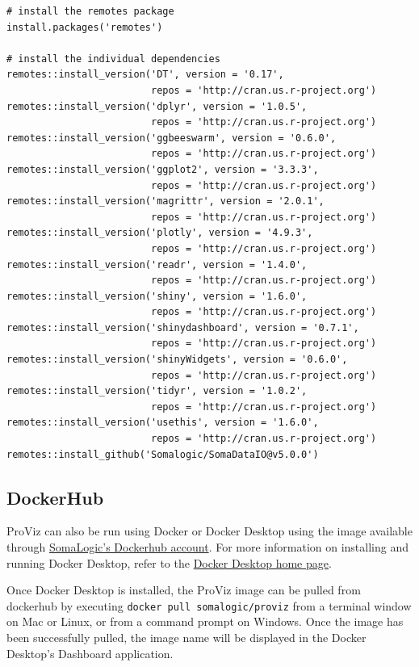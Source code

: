 \documentclass[
]{book}
\begin{document}
\begin{verbatim}
# install the remotes package 
install.packages('remotes')

# install the individual dependencies
remotes::install_version('DT', version = '0.17', 
                         repos = 'http://cran.us.r-project.org')
remotes::install_version('dplyr', version = '1.0.5',
                         repos = 'http://cran.us.r-project.org')
remotes::install_version('ggbeeswarm', version = '0.6.0',
                         repos = 'http://cran.us.r-project.org')
remotes::install_version('ggplot2', version = '3.3.3',
                         repos = 'http://cran.us.r-project.org')
remotes::install_version('magrittr', version = '2.0.1',
                         repos = 'http://cran.us.r-project.org')
remotes::install_version('plotly', version = '4.9.3',
                         repos = 'http://cran.us.r-project.org')
remotes::install_version('readr', version = '1.4.0',
                         repos = 'http://cran.us.r-project.org')
remotes::install_version('shiny', version = '1.6.0',
                         repos = 'http://cran.us.r-project.org')
remotes::install_version('shinydashboard', version = '0.7.1',
                         repos = 'http://cran.us.r-project.org')
remotes::install_version('shinyWidgets', version = '0.6.0',
                         repos = 'http://cran.us.r-project.org')
remotes::install_version('tidyr', version = '1.0.2',
                         repos = 'http://cran.us.r-project.org')
remotes::install_version('usethis', version = '1.6.0',
                         repos = 'http://cran.us.r-project.org')
remotes::install_github('Somalogic/SomaDataIO@v5.0.0')
\end{verbatim}

\hypertarget{dockerhub}{%
\subsection{DockerHub}\label{dockerhub}}

ProViz can also be run using Docker or Docker Desktop using the image available through \href{https://hub.docker.com/r/somalogic/proviz}{SomaLogic's Dockerhub account}. For more information on installing and running Docker Desktop, refer to the \href{https://www.docker.com/products/docker-desktop}{Docker Desktop home page}.

Once Docker Desktop is installed, the ProViz image can be pulled from dockerhub by executing \texttt{docker\ pull\ somalogic/proviz} from a terminal window on Mac or Linux, or from a command prompt on Windows. Once the image has been successfully pulled, the image name will be displayed in the Docker Desktop's Dashboard application.
\end{document}
